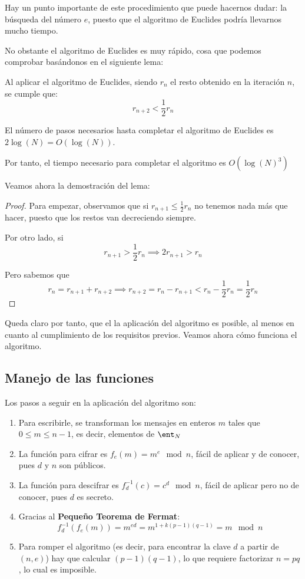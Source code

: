 Hay un punto importante de este procedimiento que puede hacernos dudar: la búsqueda del número $e$, puesto que el algoritmo de Euclides podría llevarnos mucho tiempo.

No obstante el algoritmo de Euclides es muy rápido, cosa que podemos comprobar basándonos en el siguiente lema:
\begin{lemma}
Al aplicar el algoritmo de Euclides, siendo $r_n$ el resto obtenido en la iteración $n$, se cumple que:
\[r_{n+2} < \frac{1}{2}r_n\]
\end{lemma}
\begin{corol}
El número de pasos necesarios hasta completar el algoritmo de Euclides es $2\log(N)=O(\log(N))$.

Por tanto, el tiempo necesario para completar el algoritmo es $O(\log(N)^3)$
\end{corol}

Veamos ahora la demostración del lema:
\begin{proof}
Para empezar, observamos que si $r_{n+1} \leq \frac{1}{2}r_n$ no tenemos nada más que hacer, puesto que los restos van decreciendo siempre.

Por otro lado, si 
\[r_{n+1} > \frac{1}{2} r_n \implies 2r_{n+1} > r_n\]

Pero sabemos que 
\[r_n = r_{n+1} + r_{n+2} \implies r_{n+2} = r_n-r_{n+1} < r_n-\frac{1}{2}r_n = \frac{1}{2}r_n\] 
\end{proof}

Queda claro por tanto, que el la aplicación del algoritmo es posible, al menos en cuanto al cumplimiento de los requisitos previos. Veamos ahora cómo funciona el algoritmo.

\subsection{Manejo de las funciones}

Los pasos a seguir en la aplicación del algoritmo son:
\begin{enumerate}
\item Para escribirle, se transforman los mensajes en enteros $m$ tales que $0 \leq m \leq n-1$, es decir, elementos de $\ent_N$

\item La función para cifrar es $f_e(m)=m^e \mod n$, fácil de aplicar y de conocer, pues $d$ y $n$ son públicos.

\item La función para descifrar es $f_d^{-1}(c)=c^d \mod n$, fácil de aplicar pero no de conocer, pues $d$ es secreto.

\item Gracias al \textbf{Pequeño Teorema de Fermat}:
\[f_d^{-1}(f_e(m)) = m^{ed} = m^{1+k(p-1)(q-1)} = m \mod n\]

\item Para romper el algoritmo (es decir, para encontrar la clave $d$ a partir de $(n,e)$) hay que calcular $(p-1)(q-1)$, lo que requiere factorizar $n=pq$, lo cual es imposible.

\end{enumerate}


